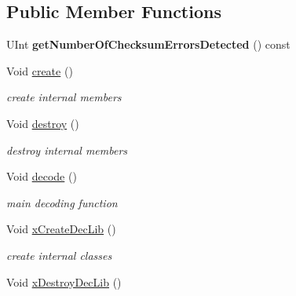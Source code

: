 \subsection*{Public Member Functions}
\begin{DoxyCompactItemize}
\item 
\mbox{\label{class_t_app_dec_top_a401859de77a00e8951fbd0157afa33d4}} 
U\+Int {\bfseries get\+Number\+Of\+Checksum\+Errors\+Detected} () const
\end{DoxyCompactItemize}
\begin{DoxyCompactItemize}
\item 
\mbox{\label{class_t_app_dec_top_abdce5e146711a64ac62f41919eca018c}} 
Void \hyperlink{class_t_app_dec_top_abdce5e146711a64ac62f41919eca018c}{create} ()
\begin{DoxyCompactList}\small\item\em create internal members \end{DoxyCompactList}\item 
\mbox{\label{class_t_app_dec_top_a8a99b4998628f82c7d72f6fd6fb95a73}} 
Void \hyperlink{class_t_app_dec_top_a8a99b4998628f82c7d72f6fd6fb95a73}{destroy} ()
\begin{DoxyCompactList}\small\item\em destroy internal members \end{DoxyCompactList}\item 
Void \hyperlink{class_t_app_dec_top_ac637a3c06eba887ddc200069b652628d}{decode} ()
\begin{DoxyCompactList}\small\item\em main decoding function \end{DoxyCompactList}\item 
\mbox{\label{class_t_app_dec_top_a2b6c82e45cd60db5cfc1c0dfe2b4dbae}} 
Void \hyperlink{class_t_app_dec_top_a2b6c82e45cd60db5cfc1c0dfe2b4dbae}{x\+Create\+Dec\+Lib} ()
\begin{DoxyCompactList}\small\item\em create internal classes \end{DoxyCompactList}\item 
\mbox{\label{class_t_app_dec_top_a738726ba39e85dd4ad02fae121acb23c}} 
Void \hyperlink{class_t_app_dec_top_a738726ba39e85dd4ad02fae121acb23c}{x\+Destroy\+Dec\+Lib} ()

\end{DoxyCompactItemize}

